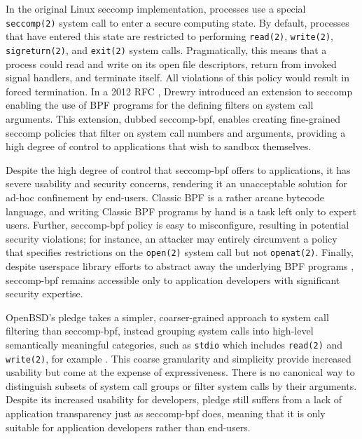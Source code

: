 
In the original Linux seccomp implementation, processes use a special \texttt{seccomp(2)} system call to enter a secure computing state. By default, processes that have entered this state are restricted to performing \texttt{read(2)}, \texttt{write(2)}, \texttt{sigreturn(2)}, and \texttt{exit(2)} system calls.  Pragmatically, this means that a process could read and write on its open file descriptors, return from invoked signal handlers, and terminate itself. All violations of this policy would result in forced termination. In a 2012 RFC \cite{drewry2012_seccomp_bpf}, Drewry introduced an extension to seccomp enabling the use of BPF programs for the defining filters on system call arguments. This extension, dubbed seccomp-bpf, enables creating fine-grained seccomp policies that filter on system call numbers and arguments, providing a high degree of control to applications that wish to sandbox themselves.

Despite the high degree of control that seccomp-bpf offers to applications, it has severe usability and security concerns, rendering it an unacceptable solution for ad-hoc confinement by end-users. Classic BPF \cite{mccanne1993_bpf} is a rather arcane bytecode language, and writing Classic BPF programs by hand is a task left only to expert users. Further, seccomp-bpf policy is easy to misconfigure, resulting in potential security violations; for instance, an attacker may entirely circumvent a policy that specifies restrictions on the \texttt{open(2)} system call but not \texttt{openat(2)}. Finally, despite userspace library efforts to abstract away the underlying BPF programs \cite{libseccomp}, seccomp-bpf remains accessible only to application developers with significant security expertise.

OpenBSD's pledge \cite{pledge} takes a simpler, coarser-grained approach to system call filtering than seccomp-bpf, instead grouping system calls into high-level semantically meaningful categories, such as \texttt{stdio} which includes \texttt{read(2)} and \texttt{write(2)}, for example \cite{anderson2017_comparison}. This coarse granularity and simplicity provide increased usability but come at the expense of expressiveness. There is no canonical way to distinguish subsets of system call groups or filter system calls by their arguments.  Despite its increased usability for developers, pledge still suffers from a lack of application transparency just as seccomp-bpf does, meaning that it is only suitable for application developers rather than end-users.

